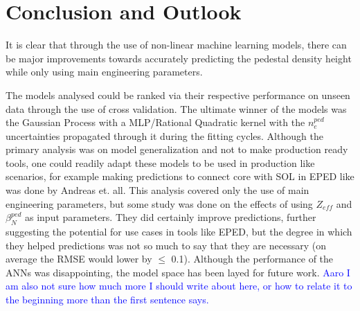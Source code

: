 \documentclass[a4paper, twoside, final, 12pt]{article}
\begin{document}
\section{Conclusion and Outlook}
It is clear that through the use of non-linear machine learning models, there can be major improvements towards accurately predicting the pedestal density height while only using main engineering parameters.

The models analysed could be ranked via their respective performance on unseen data through the use of cross validation.
The ultimate winner of the models was the Gaussian Process with a MLP/Rational Quadratic kernel with the $n_e^{ped}$ uncertainties propagated through it during the fitting cycles.
Although the primary analysis was on model generalization and not to make production ready tools, one could readily adapt these models to be used in production like scenarios, for example making predictions to connect core with SOL in EPED like was done by Andreas et. all.
This analysis covered only the use of main engineering parameters, but some study was done on the effects of using $Z_{eff}$ and $\beta_N^{ped}$ as input parameters.
They did certainly improve predictions, further suggesting the potential for use cases in tools like EPED, but the degree in which they helped predictions was not so much to say that they are necessary (on average the RMSE would lower by $\leq$ 0.1).
Although the performance of the ANNs was disappointing, the model space has been layed for future work.
\textcolor{blue}{\@ Aaro I am also not sure how much more I should write about here, or how to relate it to the beginning more than the first sentence says.}
\end{document}
